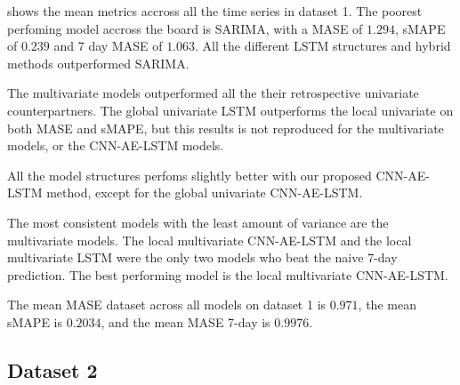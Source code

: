 \begin{figure}[h!]
\begin{subfigure}[b]{0.49\textwidth}
  \end{subfigure}
\end{figure}

 shows the mean metrics accross
all the time series in dataset 1. The poorest perfoming model accross the board
is SARIMA, with a MASE of $1.294$, sMAPE of $0.239$ and 7 day MASE of $1.063$.
All the different LSTM structures and hybrid methods outperformed SARIMA.

The multivariate models outperformed all the their retrospective univariate counterpartners.
The global univariate LSTM outperforms the local univariate on both MASE and sMAPE,
but this results is not reproduced for the multivariate models, or the CNN-AE-LSTM models.

All the model structures perfoms slightly better with our proposed CNN-AE-LSTM method, except for
the global univariate CNN-AE-LSTM.

The most consistent models with the least amount of variance are the multivariate models.
The local multivariate CNN-AE-LSTM and the local multivariate LSTM were the only two models
who beat the naive 7-day prediction. The best performing model is the local multivariate CNN-AE-LSTM.

The mean MASE dataset across all models on dataset 1 is $0.971$,
the mean sMAPE is $0.2034$,
and the mean MASE 7-day is $0.9976$.


\subsection{Dataset 2}

